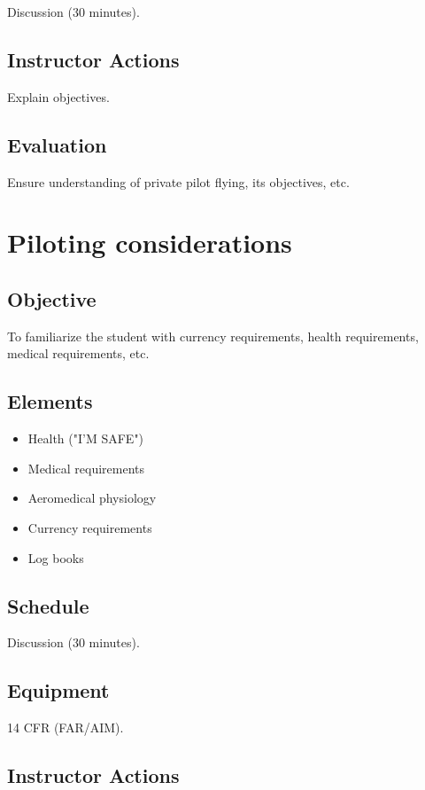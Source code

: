 \documentclass[twoside,openright]{report}
\begin{document}
Discussion (30 minutes).

\section{Instructor Actions}

Explain objectives.

\section{Evaluation}

Ensure understanding of private pilot flying, its objectives, etc.

\chapter{Piloting considerations}

\section{Objective}

To familiarize the student with currency requirements, health requirements,
medical requirements, etc.

\section{Elements}

\begin{itemize}
  \item Health ("I'M SAFE")
  \item Medical requirements
  \item Aeromedical physiology
  \item Currency requirements
  \item Log books
\end{itemize}

\section{Schedule}

Discussion (30 minutes).

\section{Equipment}

14 CFR (FAR/AIM).

\section{Instructor Actions}
\end{document}
